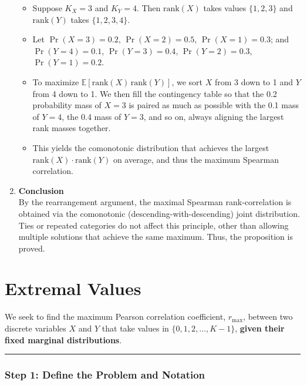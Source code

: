 \documentclass[
  12pt,
  letterpaper,
  DIV=11,
  numbers=noendperiod]{scrartcl}
\providecommand{\tightlist}{%
  \setlength{\itemsep}{0pt}\setlength{\parskip}{0pt}}\usepackage{longtable,booktabs,array}
\begin{document}
\begin{enumerate}
  \begin{itemize}
  \tightlist
  \item
    Suppose \(K_X = 3\) and \(K_Y = 4\). Then \(\mathrm{rank}(X)\) takes
    values \(\{1,2,3\}\) and \(\mathrm{rank}(Y)\) takes \(\{1,2,3,4\}\).
  \item
    Let \(\Pr(X=3) = 0.2\), \(\Pr(X=2)=0.5\), \(\Pr(X=1)=0.3\); and
    \(\Pr(Y=4)=0.1\), \(\Pr(Y=3)=0.4\), \(\Pr(Y=2)=0.3\),
    \(\Pr(Y=1)=0.2\).
  \item
    To maximize \(\mathbb{E}[\mathrm{rank}(X)\,\mathrm{rank}(Y)]\), we
    sort \(X\) from 3 down to 1 and \(Y\) from 4 down to 1. We then fill
    the contingency table so that the 0.2 probability mass of \(X=3\) is
    paired as much as possible with the 0.1 mass of \(Y=4\), the 0.4
    mass of \(Y=3\), and so on, always aligning the largest rank masses
    together.
  \item
    This yields the comonotonic distribution that achieves the largest
    \(\mathrm{rank}(X)\cdot \mathrm{rank}(Y)\) on average, and thus the
    maximum Spearman correlation.
  \end{itemize}
\item
  \textbf{Conclusion}\\
  By the rearrangement argument, the maximal Spearman rank-correlation
  is obtained via the comonotonic (descending-with-descending) joint
  distribution. Ties or repeated categories do not affect this
  principle, other than allowing multiple solutions that achieve the
  same maximum. Thus, the proposition is proved.
\end{enumerate}

\section{Extremal Values}\label{extremal-values}

We seek to find the maximum Pearson correlation coefficient,
\(r_{\max}\), between two discrete variables \(X\) and \(Y\) that take
values in \(\{0,1,2, \dots, K-1\}\), \textbf{given their fixed marginal
distributions}.

\begin{center}\rule{0.5\linewidth}{0.5pt}\end{center}

\subsubsection{\texorpdfstring{\textbf{Step 1: Define the Problem and
Notation}}{Step 1: Define the Problem and Notation}}\label{step-1-define-the-problem-and-notation}
\end{document}
